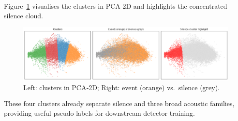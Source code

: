 \documentclass{article}
\begin{document}
Figure~\ref{fig:pca_scatter} visualises the clusters in PCA‑2D and highlights
the concentrated silence cloud.

\begin{figure}[h]
	\centering
	\includegraphics[width=.45\linewidth]{figs_tang/03_pca_clusters.png}
	\caption{Left: clusters in PCA‑2D; Right: event (orange) vs.\ silence (grey).}
	\label{fig:pca_scatter}
\end{figure}

These four clusters already separate silence and three broad acoustic families,
providing useful pseudo‑labels for downstream detector training.

\end{document}
